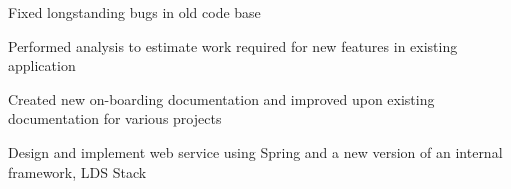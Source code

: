 \documentclass[]{deedy-resume-openfont}
\begin{document}
\begin{minipage}[t]{0.66\textwidth}
\vspace{\topsep}
\begin{tightemize}
    \item Fixed longstanding bugs in old code base
    \item Performed analysis to estimate work required for new features in existing application
    \item Created new on-boarding documentation and improved upon existing documentation for various projects
    \item Design and implement web service using Spring and a new version of an internal framework, LDS Stack
\end{tightemize}
\sectionsep

\end{minipage} 
\end{document}
